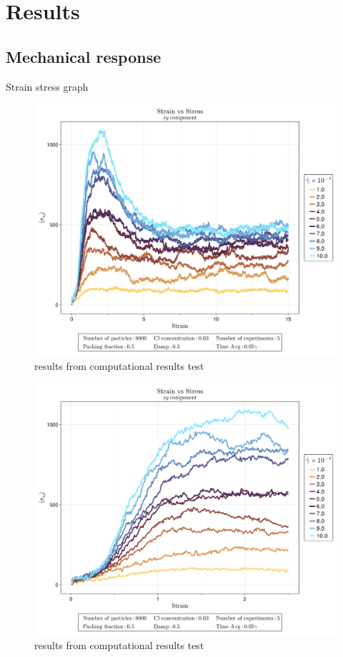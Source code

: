 \section{Results}

\subsection{Mechanical response}

Strain stress graph

\begin{figure}[ht!]
    \centering
    \includegraphics[width=\textwidth]{figs/ComputaitonalResults/CL3/StrainStressXY.png}
    \caption{results from computational results test}
\end{figure}

\begin{figure}[ht!]
    \centering
    \includegraphics[width=\textwidth]{figs/ComputaitonalResults/CL3/SmallStrainStressXY.png}
    \caption{results from computational results test}
\end{figure}

